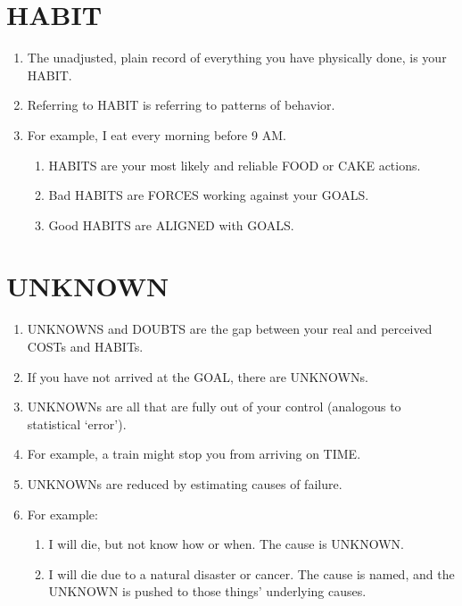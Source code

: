 \documentclass[
]{book}
\providecommand{\tightlist}{%
  \setlength{\itemsep}{0pt}\setlength{\parskip}{0pt}}
\begin{document}
\hypertarget{habit}{%
\section{HABIT}\label{habit}}

\begin{enumerate}
\def\labelenumi{\arabic{enumi}.}
\setcounter{enumi}{47}
\tightlist
\item
  The unadjusted, plain record of everything you have physically done, is your HABIT.
\item
  Referring to HABIT is referring to patterns of behavior.
\item
  For example, I eat every morning before 9 AM.

  \begin{enumerate}
  \def\labelenumii{\arabic{enumii}.}
  \tightlist
  \item
    HABITS are your most likely and reliable FOOD or CAKE actions.
  \item
    Bad HABITS are FORCES working against your GOALS.
  \item
    Good HABITS are ALIGNED with GOALS.
  \end{enumerate}
\end{enumerate}

\hypertarget{unknown}{%
\section{UNKNOWN}\label{unknown}}

\begin{enumerate}
\def\labelenumi{\arabic{enumi}.}
\setcounter{enumi}{50}
\tightlist
\item
  UNKNOWNS and DOUBTS are the gap between your real and perceived COSTs and HABITs.\\
\item
  If you have not arrived at the GOAL, there are UNKNOWNs.
\item
  UNKNOWNs are all that are fully out of your control (analogous to statistical `error').
\item
  For example, a train might stop you from arriving on TIME.
\item
  UNKNOWNs are reduced by estimating causes of failure.
\item
  For example:

  \begin{enumerate}
  \def\labelenumii{\arabic{enumii}.}
  \tightlist
  \item
    I will die, but not know how or when. The cause is UNKNOWN.
  \item
    I will die due to a natural disaster or cancer. The cause is named, and the UNKNOWN is pushed to those things' underlying causes.
  \end{enumerate}
\end{enumerate}
\end{document}
